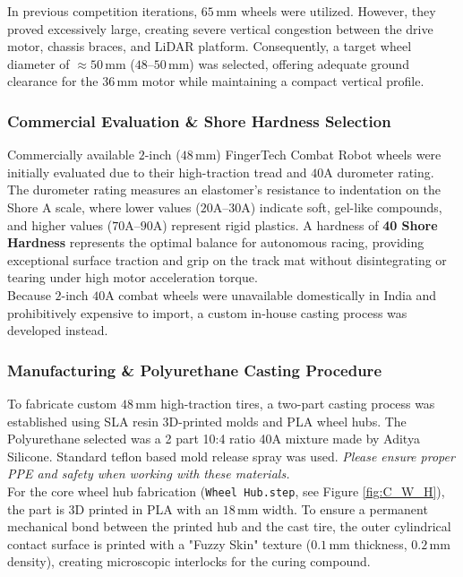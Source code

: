 \documentclass[12pt,a4paper]{article}
\begin{document}
In previous competition iterations, $65\,\text{mm}$ wheels were utilized. However, they proved excessively large, creating severe vertical congestion between the drive motor, chassis braces, and LiDAR platform. Consequently, a target wheel diameter of $\approx 50\,\text{mm}$ ($48$--$50\,\text{mm}$) was selected, offering adequate ground clearance for the $36\,\text{mm}$ motor while maintaining a compact vertical profile. \\

\subsubsection*{Commercial Evaluation \& Shore Hardness Selection}
Commercially available $2$-inch ($48\,\text{mm}$) FingerTech Combat Robot wheels were initially evaluated due to their high-traction tread and $40\text{A}$ durometer rating. \\

The durometer rating measures an elastomer's resistance to indentation on the Shore A scale, where lower values ($20\text{A}$--$30\text{A}$) indicate soft, gel-like compounds, and higher values ($70\text{A}$--$90\text{A}$) represent rigid plastics. A hardness of \textbf{40 Shore Hardness} represents the optimal balance for autonomous racing, providing exceptional surface traction and grip on the track mat without disintegrating or tearing under high motor acceleration torque. \\

Because $2$-inch $40\text{A}$ combat wheels were unavailable domestically in India and prohibitively expensive to import, a custom in-house casting process was developed instead. 

\subsubsection*{Manufacturing \& Polyurethane Casting Procedure}
To fabricate custom $48\,\text{mm}$ high-traction tires, a two-part casting process was established using SLA resin 3D-printed molds and PLA wheel hubs. The Polyurethane selected was a 2 part 10:4 ratio 40A mixture made by Aditya Silicone. Standard teflon based mold release spray was used. \textit{Please ensure proper PPE and safety when working with these materials.} \\

For the core wheel hub fabrication (\texttt{Wheel Hub.step}, see Figure \ref{fig:C_W_H}), the part is 3D printed in PLA with an $18\,\text{mm}$ width. To ensure a permanent mechanical bond between the printed hub and the cast tire, the outer cylindrical contact surface is printed with a "Fuzzy Skin" texture ($0.1\,\text{mm}$ thickness, $0.2\,\text{mm}$ density), creating microscopic interlocks for the curing compound. \\
\end{document}
